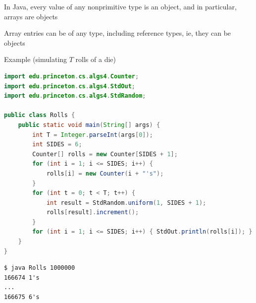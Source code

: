 \documentclass[8pt,a4paper,compress]{beamer}
\begin{document}
\begin{frame}[fragile]
\pause

In Java, every value of any nonprimitive type is an object, and in particular, arrays are objects 

\pause\bigskip

Array entries can be of any type, including reference types, ie, they can be objects

\pause\bigskip

Example (simulating $T$ rolls of a die)

\smallskip

\begin{lstlisting}[language=Java,style=focusin]
import edu.princeton.cs.algs4.Counter;
import edu.princeton.cs.algs4.StdOut;
import edu.princeton.cs.algs4.StdRandom;

public class Rolls {
    public static void main(String[] args) {
        int T = Integer.parseInt(args[0]);
        int SIDES = 6;
        Counter[] rolls = new Counter[SIDES + 1];
        for (int i = 1; i <= SIDES; i++) { 
            rolls[i] = new Counter(i + "'s"); 
        }
        for (int t = 0; t < T; t++) {
            int result = StdRandom.uniform(1, SIDES + 1);
            rolls[result].increment();
        }
        for (int i = 1; i <= SIDES; i++) { StdOut.println(rolls[i]); }
    }
}
\end{lstlisting}

\pause\bigskip

\begin{lstlisting}[language={},style=focusin]
$ java Rolls 1000000
166674 1's
...
166675 6's
\end{lstlisting}
\end{frame}
\end{document}
